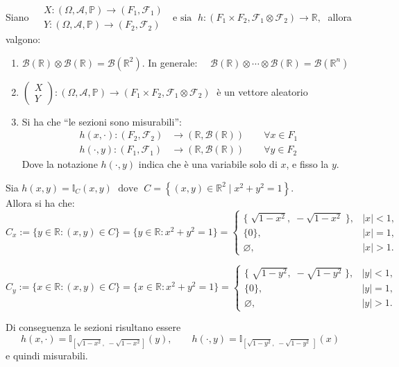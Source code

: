 \begin{teorema}
    Siano $\begin{aligned}
    & X: (\Omega, \mathcal{A}, \mathbb{P})\to (F_1, \mathcal{F}_1)\\
    & Y: (\Omega, \mathcal{A}, \mathbb{P})\to (F_2, \mathcal{F}_2)
\end{aligned}\;\text{ e sia }\;h:(F_1 \times F_2, \mathcal{F}_1 \otimes\mathcal{F}_2)\to \mathbb{R},\;$ allora valgono:
\begin{enumerate}
    \item $\mathcal{B}(\mathbb{R})\otimes \mathcal{B}(\mathbb{R}) = \mathcal{B}(\mathbb{R}^2)$. In generale: $\quad \mathcal{B}(\mathbb{R})\otimes \cdots\otimes \mathcal{B}(\mathbb{R}) = \mathcal{B}(\mathbb{R}^n)$
    \item $\begin{pmatrix} X\\Y \end{pmatrix} :(\Omega, \mathcal{A}, \mathbb{P})\to (F_1 \times F_2, \mathcal{F}_1 \otimes\mathcal{F}_2)\;$ è un vettore aleatorio
    \item Si ha che ``le sezioni sono misurabili'':
    \begin{align*}
        h(x, \cdot): (F_2, \mathcal{F}_2)&\to (\mathbb{R}, \mathcal{B}(\mathbb{R})) \qquad \forall x\in F_1\\
        h(\cdot, y): (F_1, \mathcal{F}_1)&\to (\mathbb{R}, \mathcal{B}(\mathbb{R})) \qquad \forall y\in F_2
    \end{align*}
    Dove la notazione $h(\cdot, y)$ indica che è una variabile solo di $x$, e fisso la $y$.
\end{enumerate}
\end{teorema}

\begin{esempio}
    Sia $h(x, y) = \mathbb{I}_C(x, y)\;\text{ dove }\; C = \left\{(x, y)\in\mathbb{R}^2\mid x^2+y^2=1\right\}$.\\
    Allora si ha che:
\[C_x := \{y\in\mathbb{R} : (x,y)\in C\}
     = \{y\in\mathbb{R} : x^2+y^2=1\}
     =
\begin{cases}
\{\; \sqrt{1-x^2},\; -\sqrt{1-x^2}\;\}, & |x|<1,\\[2pt]
\{0\}, & |x|=1,\\[2pt]
\varnothing, & |x|>1.
\end{cases}\]

\[C_y := \{x\in\mathbb{R} : (x,y)\in C\}
     = \{x\in\mathbb{R} : x^2+y^2=1\}
     =
\begin{cases}
\{\; \sqrt{1-y^2},\; -\sqrt{1-y^2}\;\}, & |y|<1,\\[2pt]
\{0\}, & |y|=1,\\[2pt]
\varnothing, & |y|>1.
\end{cases}\]

Di conseguenza le sezioni risultano essere
    \[h(x,\cdot) = \mathbb{I}_{[\sqrt{1-x^2},\; -\sqrt{1-x^2}]}(y),\qquad h(\cdot,y) = \mathbb{I}_{[\sqrt{1-y^2},\; -\sqrt{1-y^2}\;]}(x)\]
    e quindi misurabili.
\end{esempio}

